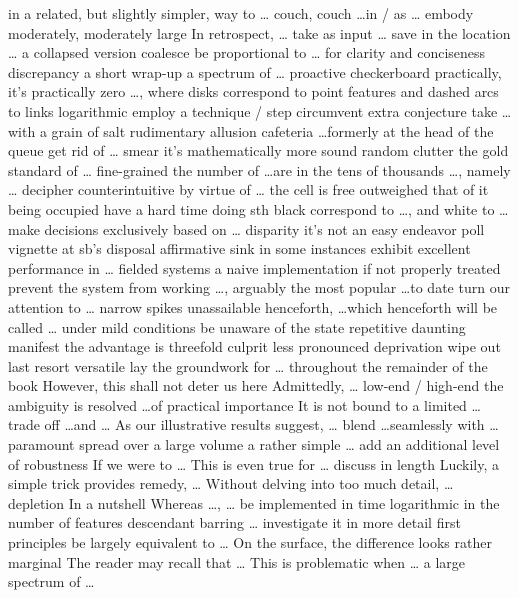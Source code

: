 \documentclass[12pt]{article}
\begin{document}
in a related, but slightly simpler, way to \dots 
couch, couch \dots in / as \dots 
embody 
moderately, moderately large 
In retrospect, \dots 
take as input \dots 
save in the location \dots 
a collapsed version 
coalesce 
be proportional to \dots 
for clarity and conciseness 
discrepancy
a short wrap-up 
a spectrum of \dots 
proactive 
checkerboard 
practically, it's practically zero 
\dots, where disks correspond to point features and dashed arcs to links 
logarithmic 
employ a technique / step 
circumvent 
extra 
conjecture 
take \dots with a grain of salt 
rudimentary
allusion 
cafeteria 
\dots formerly at the head of the queue 
get rid of \dots 
smear 
it's mathematically more sound 
random clutter 
the gold standard of \dots 
fine-grained 
the number of \dots are in the tens of thousands 
\dots, namely \dots 
decipher 
counterintuitive 
by virtue of \dots 
the cell is free outweighed that of it being occupied 
have a hard time doing sth 
black correspond to \dots, and white to \dots 
make decisions exclusively based on \dots 
disparity 
it's not an easy endeavor 
poll 
vignette 
at sb's disposal 
affirmative 
sink 
in some instances 
exhibit excellent performance in \dots 
fielded systems 
a naive implementation 
if not properly treated 
prevent the system from working 
\dots, arguably the most popular \dots to date 
turn our attention to \dots 
narrow spikes 
unassailable 
henceforth, \dots which henceforth will be called \dots 
under mild conditions 
be unaware of the state 
repetitive 
daunting 
manifest 
the advantage is threefold 
culprit 
less pronounced 
deprivation 
wipe out 
last resort 
versatile 
lay the groundwork for \dots 
throughout the remainder of the book 
However, this shall not deter us here 
Admittedly, \dots 
low-end / high-end 
the ambiguity is resolved 
\dots of practical importance 
It is not bound to a limited \dots 
trade off \dots and \dots 
As our illustrative results suggest, \dots 
blend \dots seamlessly with \dots 
paramount 
spread over a large volume 
a rather simple \dots 
add an additional level of robustness 
If we were to \dots 
This is even true for \dots 
discuss in length 
Luckily, a simple trick provides remedy, \dots 
Without delving into too much detail, \dots 
depletion 
In a nutshell 
Whereas \dots, \dots 
be implemented in time logarithmic in the number of features 
descendant 
barring \dots 
investigate it in more detail 
first principles 
be largely equivalent to \dots 
On the surface, the difference looks rather marginal 
The reader may recall that \dots 
This is problematic when \dots 
a large spectrum of \dots 
\end{document}
